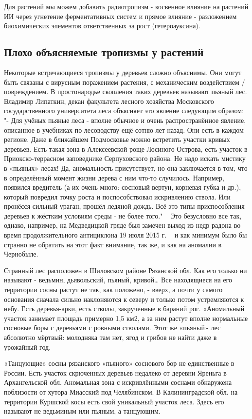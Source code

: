 \documentclass[11pt]{article}
\begin{document}
Для растений мы можем добавить радиотропизм - косвенное влияние на растений ИИ через угнетение ферментативных систем и прямое влияние - разложением биохимических элементов ответственных за рост (гетероауксина).

\subsection{Плохо объясняемые тропизмы у растений}
Некоторые встречающиеся тропизмы у деревьев сложно объяснимы. Они могут быть связаны с вирусным поражением растения, с механическим воздействием / повреждением. В простонародье скопления таких деревьев называют пьяный лес. Владимир Липаткин, декан факультета лесного хозяйства Московского государственного университета леса объясняет это явление следующим образом: "- Для учёных пьяные леса - вполне обычное и очень распространённое явление, описанное в учебниках по лесоводству ещё сотню лет назад. Они есть в каждом регионе. Даже в ближайшем Подмосковье можно встретить участки кривых деревьев. Есть такая зона в Алексеевской роще Лосиного Острова, есть участок в Приокско-террасном заповеднике Серпуховского района. Не надо искать мистику в «пьяных» лесах! Да, аномальность присутствует, но она заключается в том, что в определённый момент жизни дерева с ним что-то случилось. Например, появился вредитель (а их очень много: сосновый вертун, корневая губка и др.), который повредил точку роста и поспособствовал искривлению ствола. Или пронёсся сильный ураган, прошёл ледяной дождь. Всё это типы приспособления деревьев к жёстким условиям среды - не более того." ~\cite{lipatkin}
Это безусловно все так, однако, например, на Медведицкой гряде был замечен выход из недр радона во время продолжительного антициклона 19 июля 2015 г. ~\cite{petuhov} и как минимум было бы странно не обратить на этот факт внимание, так же, и как на аномалии в Чернобыле.

Странный лес расположен в Шиловском районе Рязанской обл. Как его только ни называют - ведьмин, дьявольский, пьяный, кривой… Все находящиеся на его территории сосны растут не так, как положено, - вверх, а почти у самого основания сначала сильно наклоняются к северу и только потом устремляются к небу. Есть деревья-арки, есть стволы, закрученные в бараний рог. «Аномальный участок занимает площадь примерно 1,5 км2, а за ним растут вполне нормальные сосновые боры с деревьями с ровными стволами. Этот же «пьяный» лес абсолютно мёрт­вый: молодняка там нет, ягод и грибов не найти даже в урожайный год.

«Танцующие» сосны рязанского «пьяного» соснового бор не единственные в России. Есть участок скрюченных деревьев недалеко от деревни Яреньга в Архангельской обл. Аномальная зона с искривлёнными сос­нами обнаружена поблизости от хутора Миасский под Челябинском. В Калининградской обл. на территории Куршской косы есть свой уникальный участок леса. Здесь его называют не ведьминым или пьяным, а танцующим. 
\end{document}
